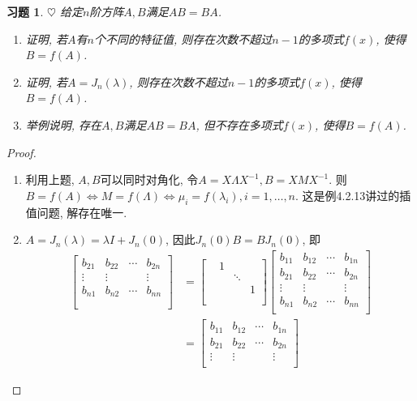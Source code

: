 \documentclass{ctexart}
\newtheorem{exercise}[thm]{习题}
\def\hard{$\heartsuit$}
\begin{document}
\begin{exercise} \hard
给定$n$阶方阵$A, B$满足$AB=BA$. 
\begin{enumerate}
\item 证明, 若$A$有$n$个不同的特征值, 则存在次数不超过$n-1$的多项式$f(x)$, 使得$B=f(A)$. 
\item 证明, 若$A=J_n(\lambda)$, 则存在次数不超过$n-1$的多项式$f(x)$, 使得$B=f(A)$. 
\item  举例说明, 存在$A, B$满足$AB=BA$, 但不存在多项式$f(x)$, 使得$B=f(A)$. 
\end{enumerate}
\end{exercise}
\begin{proof}
	\begin{enumerate}
		\item 利用上题, $A,B$可以同时对角化, 令$A=X\Lambda X^{-1},B=XMX^{-1}$. 
			则$B=f(A)\Leftrightarrow M=f(\Lambda) \Leftrightarrow \mu_i=f(\lambda_i),i=1,\dots,n$. 这是例4.2.13讲过的插值问题, 解存在唯一. 
		\item $A=J_n(\lambda)=\lambda I +J_n(0)$, 因此$J_n(0)B=BJ_n(0)$, 即
			\begin{align*}
				\begin{bmatrix}
					b_{21} & b_{22} & \cdots & b_{2n}\\
					\vdots & \vdots &  & \vdots \\
					b_{n1} & b_{n2} & \cdots & b_{nn}\\
					\\
				\end{bmatrix}
				&=\begin{bmatrix}
					& 1\\ && \ddots \\ &&& 1\\ \\
				\end{bmatrix}\begin{bmatrix}
					b_{11} & b_{12} & \cdots & b_{1n}\\
					b_{21} & b_{22} & \cdots & b_{2n}\\
					\vdots & \vdots &  & \vdots \\
					b_{n1} & b_{n2} & \cdots & b_{nn}\\
				\end{bmatrix}
				\\&=\begin{bmatrix}
					b_{11} & b_{12} & \cdots & b_{1n}\\
					b_{21} & b_{22} & \cdots & b_{2n}\\
					\vdots & \vdots &  & \vdots \\

\end{bmatrix}
\end{align*}
\end{enumerate}
\end{proof}
\end{document}
